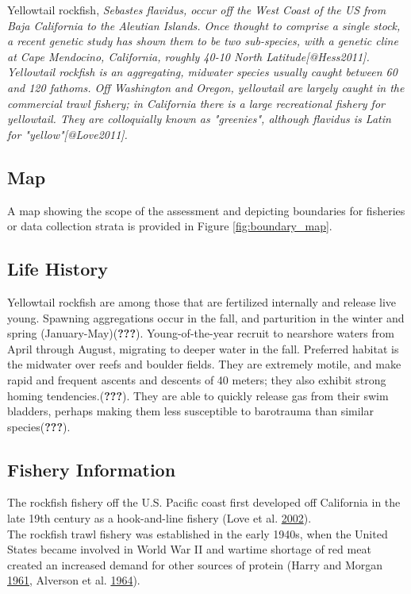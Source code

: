 \documentclass[12pt,]{article}
\begin{document}
Yellowtail rockfish,
\it{Sebastes} flavidus, occur off the West Coast of the US from Baja California to the Aleutian Islands.  Once thought to comprise a single stock, a recent genetic study has shown them to be two sub-species, with a genetic cline at Cape Mendocino, California, roughly 40-10 North Latitude[@Hess2011].  Yellowtail rockfish is an aggregating, midwater species usually caught between 60 and 120 fathoms.  Off Washington and Oregon, yellowtail are largely caught in the commercial trawl fishery; in California there is a large recreational fishery for yellowtail.  They are colloquially known as "greenies", although \it{flavidus} is Latin for "yellow"[@Love2011].

\subsection{Map}\label{map}

A map showing the scope of the assessment and depicting boundaries for
fisheries or data collection strata is provided in Figure
\ref{fig:boundary_map}.

\subsection{Life History}\label{life-history}

Yellowtail rockfish are among those that are fertilized internally and
release live young. Spawning aggregations occur in the fall, and
parturition in the winter and spring (January-May)({\textbf{???}}).
Young-of-the-year recruit to nearshore waters from April through August,
migrating to deeper water in the fall. Preferred habitat is the midwater
over reefs and boulder fields. They are extremely motile, and make rapid
and frequent ascents and descents of 40 meters; they also exhibit strong
homing tendencies.({\textbf{???}}). They are able to quickly release gas
from their swim bladders, perhaps making them less susceptible to
barotrauma than similar species({\textbf{???}}).

\subsection{Fishery Information}\label{fishery-information}

The rockfish fishery off the U.S. Pacific coast first developed off
California in the late 19th century as a hook-and-line fishery (Love et
al. \protect\hyperlink{ref-Love2002}{2002}).\\
The rockfish trawl fishery was established in the early 1940s, when the
United States became involved in World War II and wartime shortage of
red meat created an increased demand for other sources of protein (Harry
and Morgan \protect\hyperlink{ref-Harry1961}{1961}, Alverson et al.
\protect\hyperlink{ref-Alverson1964}{1964}).
\end{document}
